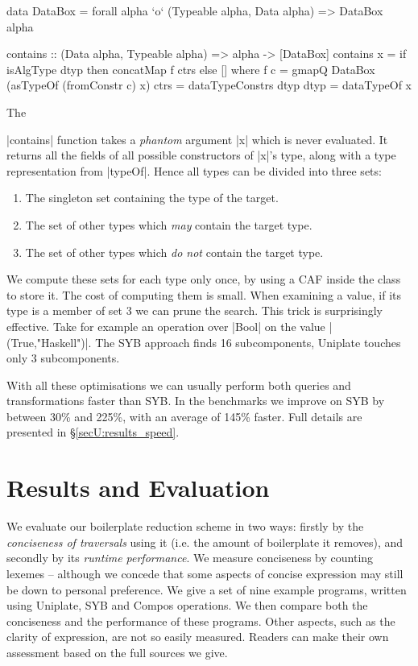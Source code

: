 
\begin{onepage}
\ignore\begin{code}
data DataBox = forall alpha `o` (Typeable alpha, Data alpha) => DataBox alpha

contains :: (Data alpha, Typeable alpha) => alpha -> [DataBox]
contains x = if isAlgType dtyp then concatMap f ctrs else []
    where
        f c = gmapQ DataBox (asTypeOf (fromConstr c) x)
        ctrs = dataTypeConstrs dtyp
        dtyp = dataTypeOf x
\end{code}
\end{onepage}

The \ignore|contains| function takes a \textit{phantom} argument |x| which is never evaluated. It returns all the fields of all possible constructors of |x|'s type, along with a type representation from |typeOf|. Hence all types can be divided into three sets:

\begin{enumerate}
\item The singleton set containing the type of the target.
\item The set of other types which \textit{may} contain the target type.
\item The set of other types which \textit{do not} contain the target type.
\end{enumerate}

We compute these sets for each type only once, by using a CAF inside the class to store it. The cost of computing them is small. When examining a value, if its type is a member of set 3 we can prune the search. This trick is surprisingly effective. Take for example an operation over |Bool| on the value |(True,"Haskell")|. The SYB approach finds 16 subcomponents, Uniplate touches only 3 subcomponents.

With all these optimisations we can usually perform both queries and transformations faster than SYB. In the benchmarks we improve on SYB by between 30\% and 225\%, with an average of 145\% faster. Full details are presented in \S\ref{secU:results_speed}.


\section{Results and Evaluation}
\label{secU:results}

We evaluate our boilerplate reduction scheme in two ways: firstly by the \textit{conciseness of traversals} using it (i.e. the amount of boilerplate it removes), and secondly by its \textit{runtime performance}. We measure conciseness by counting lexemes -- although we concede that some aspects of concise expression may still be down to personal preference. We give a set of nine example programs, written using Uniplate, SYB and Compos operations. We then compare both the conciseness and the performance of these programs. Other aspects, such as the clarity of expression, are not so easily measured. Readers can make their own assessment based on the full sources we give.

